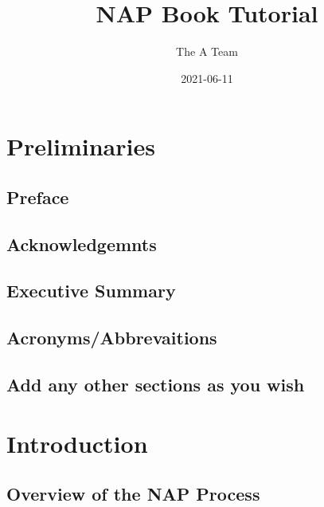 \documentclass[
]{book}
\title{NAP Book Tutorial}
\author{The A Team}
\date{2021-06-11}
\begin{document}
\maketitle

{
\setcounter{tocdepth}{1}
\tableofcontents
}
\hypertarget{preliminaries}{%
\chapter{Preliminaries}\label{preliminaries}}

\hypertarget{preface}{%
\section{Preface}\label{preface}}

\hypertarget{acknowledgemnts}{%
\section{Acknowledgemnts}\label{acknowledgemnts}}

\hypertarget{executive-summary}{%
\section{Executive Summary}\label{executive-summary}}

\hypertarget{acronymsabbrevaitions}{%
\section{Acronyms/Abbrevaitions}\label{acronymsabbrevaitions}}

\hypertarget{add-any-other-sections-as-you-wish}{%
\section{Add any other sections as you wish}\label{add-any-other-sections-as-you-wish}}

\hypertarget{introduction}{%
\chapter{Introduction}\label{introduction}}

\hypertarget{overview-of-the-nap-process}{%
\section{Overview of the NAP Process}\label{overview-of-the-nap-process}}
\end{document}
